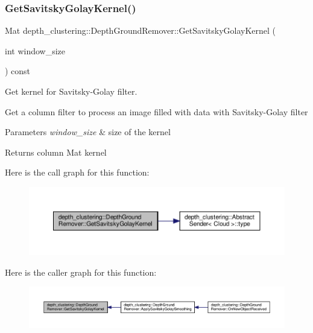 \subsubsection{\texorpdfstring{Get\+Savitsky\+Golay\+Kernel()}{GetSavitskyGolayKernel()}}
{\footnotesize\ttfamily Mat depth\+\_\+clustering\+::\+Depth\+Ground\+Remover\+::\+Get\+Savitsky\+Golay\+Kernel (\begin{DoxyParamCaption}\item[{int}]{window\+\_\+size }\end{DoxyParamCaption}) const\hspace{0.3cm}{\ttfamily [protected]}}



Get kernel for Savitsky-\/\+Golay filter. 

Get a column filter to process an image filled with data with Savitsky-\/\+Golay filter


\begin{DoxyParams}{Parameters}
{\em window\+\_\+size} & size of the kernel \\
\hline
\end{DoxyParams}
\begin{DoxyReturn}{Returns}
column Mat kernel 
\end{DoxyReturn}
Here is the call graph for this function\+:\nopagebreak
\begin{figure}[H]
\begin{center}
\leavevmode
\includegraphics[width=350pt]{classdepth__clustering_1_1DepthGroundRemover_a2aeaac524f19861b26c171d845f67e2e_cgraph}
\end{center}
\end{figure}
Here is the caller graph for this function\+:\nopagebreak
\begin{figure}[H]
\begin{center}
\leavevmode
\includegraphics[width=350pt]{classdepth__clustering_1_1DepthGroundRemover_a2aeaac524f19861b26c171d845f67e2e_icgraph}
\end{center}
\end{figure}
\mbox{\label{classdepth__clustering_1_1DepthGroundRemover_ab2c3bcc8df6cc70ad5057f5ec3bd074f}} 
